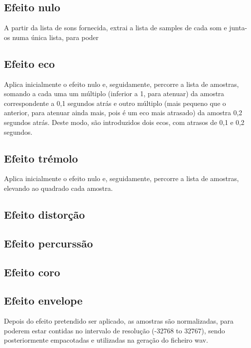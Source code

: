 \subsection{Efeito nulo}
A partir da lista de sons fornecida, extrai a lista de samples de cada som e junta-os numa única lista, para poder

\subsection{Efeito eco}
Aplica inicialmente o efeito nulo e, seguidamente, percorre a lista de amostras, somando a cada uma um múltiplo (inferior a 1, para atenuar) da amostra correspondente a 0,1 segundos atrás e outro múltiplo (mais pequeno que o anterior, para atenuar ainda mais, pois é um eco mais atrasado) da amostra 0,2 segundos atrás. Deste modo, são introduzidos dois ecos, com atrasos de 0,1 e 0,2 segundos.

\subsection{Efeito trémolo}
Aplica inicialmente o efeito nulo e, seguidamente, percorre a lista de amostras, elevando ao quadrado cada amostra.

\subsection{Efeito distorção}

\subsection{Efeito percurssão}

\subsection{Efeito coro}

\subsection{Efeito envelope}


Depois do efeito pretendido ser aplicado, as amostras são normalizadas, para poderem estar contidas no intervalo de resolução (-32768 to 32767), sendo posteriormente empacotadas e utilizadas na geração do ficheiro wav.